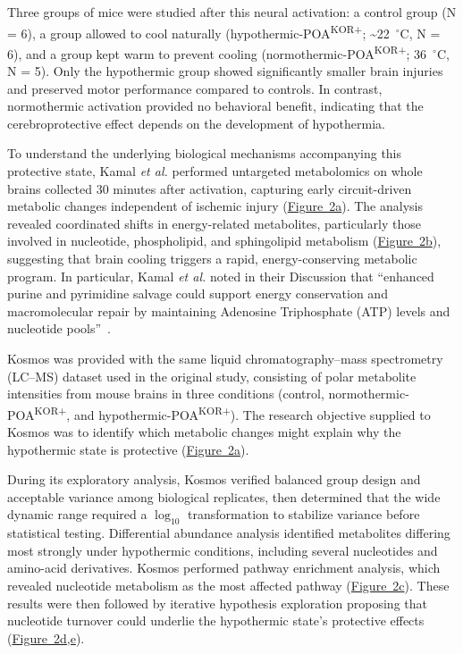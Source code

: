 \documentclass{article}
\begin{document}
Three groups of mice were studied after this neural activation: a control group (N = 6), a group allowed to cool naturally (hypothermic-POA\textsuperscript{KOR+}; \textasciitilde22~$^{\circ}$C, N = 6), and a group kept warm to prevent cooling (normothermic-POA\textsuperscript{KOR+}; 36~$^{\circ}$C, N = 5). Only the hypothermic group showed significantly smaller brain injuries and preserved motor performance compared to controls. In contrast, normothermic activation provided no behavioral benefit, indicating that the cerebroprotective effect depends on the development of hypothermia.

To understand the underlying biological mechanisms accompanying this protective state, Kamal \textit{et al.} performed untargeted metabolomics on whole brains collected 30 minutes after activation, capturing early circuit-driven metabolic changes independent of ischemic injury (\hyperref[fig:fig2]{Figure~2a}). The analysis revealed coordinated shifts in energy-related metabolites, particularly those involved in nucleotide, phospholipid, and sphingolipid metabolism (\hyperref[fig:fig2]{Figure~2b}), suggesting that brain cooling triggers a rapid, energy-conserving metabolic program. In particular, Kamal \textit{et al.} noted in their Discussion that ``enhanced purine and pyrimidine salvage could support energy conservation and macromolecular repair by maintaining Adenosine Triphosphate (ATP) levels and nucleotide pools''~\cite{kamal_preoptic_2025}.

Kosmos was provided with the same liquid chromatography--mass spectrometry (LC--MS) dataset used in the original study, consisting of polar metabolite intensities from mouse brains in three conditions (control, normothermic-POA\textsuperscript{KOR+}, and hypothermic-POA\textsuperscript{KOR+}). The research objective supplied to Kosmos was to identify which metabolic changes might explain why the hypothermic state is protective (\hyperref[fig:fig2]{Figure~2a}).

During its exploratory analysis, Kosmos verified balanced group design and acceptable variance among biological replicates, then determined that the wide dynamic range required a $\log_{10}$ transformation to stabilize variance before statistical testing. Differential abundance analysis identified metabolites differing most strongly under hypothermic conditions, including several nucleotides and amino-acid derivatives. Kosmos performed pathway enrichment analysis, which revealed nucleotide metabolism as the most affected pathway (\hyperref[fig:fig2]{Figure~2c}). These results were then followed by iterative hypothesis exploration proposing that nucleotide turnover could underlie the hypothermic state’s protective effects (\hyperref[fig:fig2]{Figure~2d,e}).
\end{document}
